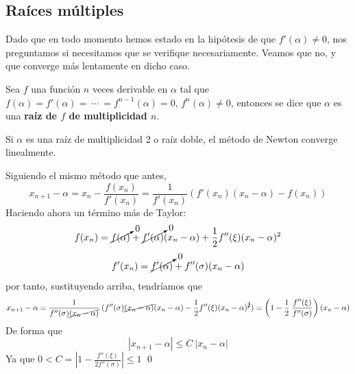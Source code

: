     \subsection{Ra{\'i}ces m{\'u}ltiples}
    Dado que en todo momento hemos estado en la hipótesis de que $f'(\alpha)\neq 0$, nos preguntamos si necesitamos que se verifique necesariamente. Veamos que no, y que converge más lentamente en dicho caso.
    \begin{defin}
        Sea $f$ una función $n$ veces derivable en $\alpha$ tal que $f(\alpha)=f'(\alpha)= \: \cdots \: = f^{n-1}(\alpha)=0$, $f^n(\alpha)\neq 0$, entonces se dice que $\alpha$ es una \textbf{raíz de $f$ de multiplicidad $n$}.
    \end{defin}
    \begin{prop}
        Si $\alpha$ es una raíz de multiplicidad 2 o raíz doble, el método de Newton converge linealmente.
    \end{prop}
    \begin{dem}
        Siguiendo el mismo método que antes, 
        $$x_{n+1}-\alpha=x_n-\dfrac{f(x_n)}{f'(x_n)}=\dfrac{1}{f'(x_n)}(f'(x_n)(x_n-\alpha)-f(x_n))$$
        Haciendo ahora un término más de Taylor:
        $$f(x_n)=\cancelto{0}{f(\alpha)}+\cancelto{0}{f'(\alpha)}(x_n-\alpha)+\dfrac{1}{2}f''(\xi)(x_n-\alpha)^2$$
        $$f'(x_n)= \cancelto{0}{f'(\alpha)}+f''(\sigma)(x_n-\alpha)$$
        por tanto, sustituyendo arriba, tendríamos que 
        $$x_{n+1}-\alpha=\dfrac{1}{f''(\sigma)\cancel{(x_n-\alpha)}}\:(f''(\sigma)\cancel{(x_n-\alpha)}(x_n-\alpha)-\dfrac{1}{2}f''(\xi)(x_n-\alpha)^{\cancel{2}} )=\left(1-\dfrac{1}{2} \: \dfrac{f''(\xi)}{f''(\sigma)}\right)(x_n-\alpha)$$
        De forma que 
        $$|x_{n+1}-\alpha|\leq C \:|x_{n}-\alpha|$$ 
        Ya que
        $0<C=\left|1-\frac{f''(\xi)}{2f''(\sigma)}\right|\leq 1$
    \qed\end{dem}
  
